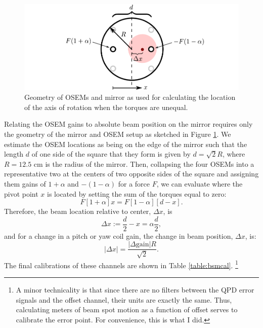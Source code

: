 \begin{figure}
\begin{centering}
\includegraphics{figures/geometry_mirror_osems.pdf}
\caption[Diagram of mirror and OSEM geometry]{Geometry of OSEMs and
  mirror as used for calculating the location of the axis of rotation
  when the torques are unequal.}
\label{fig:mirror_osem_geometry}
\end{centering}
\end{figure}

Relating the OSEM gains to absolute beam position on the mirror
requires only the geometry of the mirror and OSEM setup as sketched in
Figure \ref{fig:mirror_osem_geometry}. We estimate the OSEM locations as
being on the edge of the mirror such that the length $d$ of one side
of the square that they form is given by $d =\sqrt{2} R$, where $R =
12.5$ cm is the radius of the mirror. Then, collapsing the four OSEMs
into a representative two at the centers of two opposite sides of the
square and assigning them gains of $1 + \alpha$ and $-(1-\alpha)$ for
a force $F$, we can evaluate where the pivot point $x$ is located by
setting the sum of the torques equal to zero:
\begin{equation}
F [1+\alpha] x = F [1-\alpha][d-x].
\end{equation}
Therefore, the beam location relative to center, $\Delta x$, is
\begin{equation}
\Delta x := \frac{d}{2} - x = \alpha \frac{d}{2},
\end{equation}
and for a change in a pitch or yaw coil gain, the change in beam
position, $\Delta x$, is:
\begin{equation}
|\Delta{x}| = \frac{|\Delta{\mbox{gain}}| R}{\sqrt{2}} .
\end{equation}
The final calibrations of these channels are shown in Table
\ref{table:bsmcal}. \footnote{A minor technicality is that since there
  are no filters between the QPD error signals and the offset channel,
  their units are exactly the same. Thus, calculating meters of beam
  spot motion as a function of offset serves to calibrate the error
  point. For convenience, this is what I did.}

